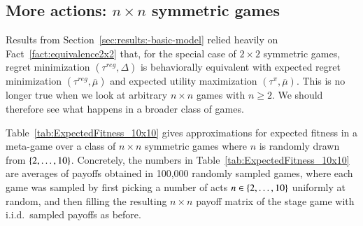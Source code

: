 \documentclass[fleqn,reqno,11pt]{article}
\begin{document}
                                   
\subsection{More actions: $n \times n$ symmetric games}
\label{sec:n-times-n}

Results from Section~\ref{sec:results:-basic-model} relied heavily on
Fact~\ref{fact:equivalence2x2} that, for the special case of $2 \times 2$ symmetric games,
regret minimization $(\tau^{reg}, \Delta)$ is behaviorally equivalent with expected
regret minimization $(\tau^{reg}, \overline{\mu})$ and expected utility maximization
$(\tau^{\pi}, \overline{\mu})$. This is no longer true when we look at arbitrary $n \times n$
games with $n \ge 2$. We should therefore see what happens in a broader class of games.

Table~\ref{tab:ExpectedFitness_10x10} gives approximations for expected fitness in a
meta-game over a class of $n \times n$ symmetric games where $n$ is randomly drawn from
$\left\{2, \dots, 10\right\}$. Concretely, the numbers in Table~\ref{tab:ExpectedFitness_10x10} are
averages of payoffs obtained in 100,000 randomly sampled games, where each game was sampled by
first picking a number of acts $n \in \left\{2, \dots, 10\right\}$ uniformly at random, and then filling
the resulting $n \times n$ payoff matrix of the stage game with i.i.d.~sampled payoffs as
before.
\end{document}
